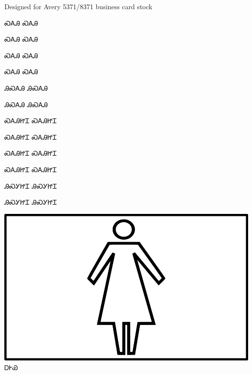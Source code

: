 \documentclass[avery5371]{flashcards}%
\begin{document}
Designed for Avery 5371/8371 business card stock

\begin{flashcard}{\Huge ᏍᎪᎯ}
\Huge ᏍᎪᎯ
\end{flashcard}

\begin{flashcard}{\Huge ᏍᎪᎯ}
\Huge ᏍᎪᎯ
\end{flashcard}

\begin{flashcard}{\Huge ᏍᎪᎯ}
\Huge ᏍᎪᎯ
\end{flashcard}

\begin{flashcard}{\Huge ᏍᎪᎯ}
\Huge ᏍᎪᎯ
\end{flashcard}

\begin{flashcard}{\Huge ᎯᏍᎪᎯ}
\Huge ᎯᏍᎪᎯ
\end{flashcard}

\begin{flashcard}{\Huge ᎯᏍᎪᎯ}
\Huge ᎯᏍᎪᎯ
\end{flashcard}

\begin{flashcard}{\Huge ᏍᎪᎯᏥᏆ}
\Huge ᏍᎪᎯᏥᏆ
\end{flashcard}

\begin{flashcard}{\Huge ᏍᎪᎯᏥᏆ}
\Huge ᏍᎪᎯᏥᏆ
\end{flashcard}

\begin{flashcard}{\Huge ᏍᎪᎯᏥᏆ}
\Huge ᏍᎪᎯᏥᏆ
\end{flashcard}

\begin{flashcard}{\Huge ᏍᎪᎯᏥᏆ}
\Huge ᏍᎪᎯᏥᏆ
\end{flashcard}

\begin{flashcard}{\Huge ᎯᏍᎩᏥᏆ}
\Huge ᎯᏍᎩᏥᏆ
\end{flashcard}

\begin{flashcard}{\Huge ᎯᏍᎩᏥᏆ}
\Huge ᎯᏍᎩᏥᏆ
\end{flashcard}


\begin{flashcard}{
\includegraphics[width=0.95\columnwidth,height=.51\columnwidth,keepaspectratio]{../artwork/objects-animate/agehya}
}
\Huge ᎠᎨᏯ
\end{flashcard}
\end{document}
